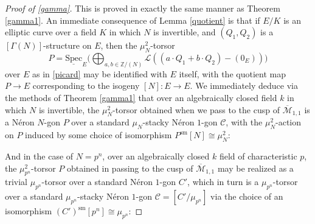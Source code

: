 \documentclass[11pt]{amsart}
\theoremstyle{definition}
\begin{document}
\begin{proof}[Proof of \ref{gamma}]
This is proved in exactly the same manner as Theorem \ref{gamma1}. An immediate consequence of Lemma \ref{quotient} is that if $E/K$ is an elliptic curve over a field $K$ in which $N$ is invertible, and $(Q_1,Q_2)$ is a $[\Gamma(N)]$-structure on $E$, then the $\mu_N^2$-torsor 
\begin{displaymath}
P = \underline{\mathrm{Spec}}_E \big( \bigoplus_{a,b \in \mathbb{Z}/(N)} {\mathcal{L}}((a\cdot Q_1 + b\cdot Q_2)-(0_E)) \big) 
\end{displaymath}
over $E$ as in \ref{picard} may be identified with $E$ itself, with the quotient map $P \rightarrow E$ corresponding to the isogeny $[N]: E \rightarrow E$. We immediately deduce via the methods of Theorem \ref{gamma1} that over an algebraically closed field $k$ in which $N$ is invertible, the $\mu_N^2$-torsor obtained when we pass to the cusp of $\overline{\mathcal{M}}_{1,1}$ is a N\'eron $N$-gon $P$ over a standard $\mu_N$-stacky N\'eron $1$-gon ${\mathcal{C}}$, with the $\mu_N^2$-action on $P$ induced by some choice of isomorphism $P^{\mathrm{sm}}[N] \cong \mu_N^2$:

\begin{center}
\end{center}
And in the case of $N = p^n$, over an algebraically closed $k$ field of characteristic $p$, the $\mu_{p^n}^2$-torsor $P$ obtained in passing to the cusp of $\overline{\mathcal{M}}_{1,1}$ may be realized as a trivial $\mu_{p^n}$-torsor over a standard N\'eron $1$-gon $C'$, which in turn is a $\mu_{p^n}$-torsor over a standard $\mu_{p^n}$-stacky N\'eron $1$-gon ${\mathcal{C}} = [C'/\mu_{p^n}]$ via the choice of an isomorphism $(C')^{\mathrm{sm}}[p^n] \cong \mu_{p^n}$:


\end{proof}
\end{document}
